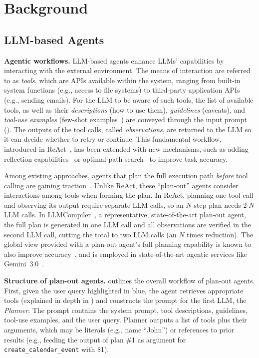 \section{Background} \label{sect:background}


\subsection{LLM-based Agents} \label{sect:agents}
{\bf Agentic workflows.} LLM-based agents enhance LLMs' capabilities by interacting with the external environment. The means of interaction are referred to as \emph{tools}, which are APIs available within the system, ranging from built-in system functions (e.g., access to file systems) to third-party application APIs (e.g., sending emails). For the LLM to be aware of such tools, the list of available tools, as well as their \textit{descriptions} (how to use them), \textit{guidelines} (caveats), and \textit{tool-use examples} (few-shot examples~\cite{gpt3}) are conveyed through the input prompt~\cite{mcp, rag_mcp, toolformer, hugginggpt, llama3} (). The outputs of the tool calls, called \textit{observations}, are returned to the LLM so it can decide whether to retry or continue. This fundamental workflow, introduced in ReAct~\cite{react}, has been extended with new mechanisms, such as adding reflection capabilities~\cite{reflexion} or optimal-path search~\cite{lats} to improve task accuracy.

Among existing approaches, agents that plan the full execution path \textit{before} tool calling are gaining traction~\cite{llmcompiler, plan_and_act, less_is_more, fused_parallel_function_calling}. Unlike ReAct, these ``plan-out'' agents consider interactions among tools when forming the plan. In ReAct, planning one tool call and observing its output require separate LLM calls, so an $N$-step plan needs 2$\cdot$$N$ LLM calls. In LLMCompiler~\cite{llmcompiler}, a representative, state-of-the-art plan-out agent, the full plan is generated in one LLM call and all observations are verified in the second LLM call, cutting the total to two LLM calls (an $N$ times reduction). The global view provided with a plan-out agent's full planning capability is known to also improve accuracy~\cite{llmcompiler, plan_and_act}, and is employed in state-of-the-art agentic services like Gemini~3.0~\cite{gemini_3.0}.


{\bf Structure of plan-out agents.}  outlines the overall workflow of plan-out agents. First, given the user query highlighted in blue, the agent retrieves appropriate tools (explained in depth in ) and constructs the prompt for the first LLM, the \textit{Planner}. The prompt contains the system prompt, tool descriptions, guidelines, tool-use examples, and the user query. Planner outputs a list of tools plus their arguments, which may be literals (e.g., name ``John'') or references to prior results (e.g., feeding the output of plan \#1 as argument for \texttt{create\_calendar\_event} with \$1).

